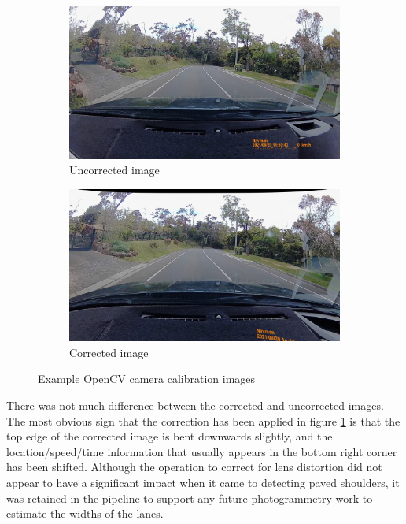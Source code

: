 \documentclass[11pt,twoside]{report}
\begin{document}
\begin{figure}[h]
\centering
\begin{subfigure}{0.45\textwidth}
	\includegraphics[width=\textwidth]{f008_uncorrected.png}
	\caption{Uncorrected image}
\end{subfigure}
\hfill
\begin{subfigure}{0.45\textwidth}
	\includegraphics[width=\textwidth]{f008_corrected.png}
	\caption{Corrected image}
\end{subfigure}

\caption{Example OpenCV camera calibration images}
\label{fig:008}
\end{figure}

There was not much difference between the corrected and uncorrected images.  The most obvious sign that the correction has been applied in figure \ref{fig:008} is that the top edge of the corrected image is bent downwards slightly, and the location/speed/time information that usually appears in the bottom right corner has been shifted.  Although the operation to correct for lens distortion did not appear to have a significant impact when it came to detecting paved shoulders, it was retained in the pipeline to support any future photogrammetry work to estimate the widths of the lanes.
\end{document}
